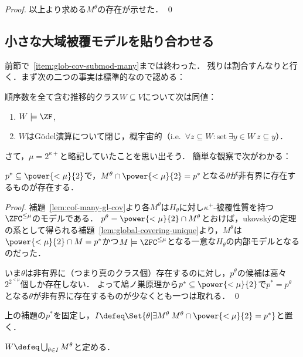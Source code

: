 \documentclass[a4j,leqno]{ltjsarticle}
\begin{document}
\begin{proof}
 以上より求める$M^\theta$の存在が示せた． \qed
\end{proof}

\subsection{小さな大域被覆モデルを貼り合わせる}
前節で~\ref{item:glob-cov-submod-many}までは終わった．
残りは割合すんなりと行く．まず次の二つの事実は標準的なので認める：
\begin{fact}\label{lem:ZF-model-char}
 順序数を全て含む推移的クラス$W \subseteq V$について次は同値：
 \begin{enumerate}
  \item $W \models \ZF$,
  \item $W$はG\"{o}del演算について閉じ，概宇宙的（i.e.\ $\forall z \subseteq W: \text{set}\: \exists y \in W\: z \subseteq y$）．
        \label{}
 \end{enumerate}
\end{fact}

さて，$\mu = 2^{\kappa+}$と略記していたことを思い出そう．
簡単な観察で次がわかる：
\begin{lemma}
 $p^* \subseteq \power{<\mu}{2}$で，$M^\theta \cap \power{<\mu}{2} = p^*$となる$\theta$が非有界に存在するものが存在する．
\end{lemma}
\begin{proof}
 補題~\ref{lem:cof-many-gl-cov}より各$M^\theta$は$H_\theta$に対し$\kappa^+$-被覆性質を持つ$\ZFC^{\leq\mu}$のモデルである．
 $p^\theta = \power{<\mu}{2} \cap M^\theta$とおけば，ukovsk\'{y}の定理の系として得られる補題~\ref{lem:global-covering-unique}より，$M^\theta$は$\power{<\mu}{2} \cap M = p^*$かつ$M \models \ZFC^{\leq\mu}$となる一意な$H_\theta$の内部モデルとなるのだった．

 いま$\theta$は非有界に（つまり真のクラス個）存在するのに対し，$p^\theta$の候補は高々$2^{2^{<\mu}}$個しか存在しない．
 よって鳩ノ巣原理から$p^* \subseteq \power{<\mu}{2}$で$p^* = p^\theta$となる$\theta$が非有界に存在するものが少なくとも一つは取れる． \qed
\end{proof}

\begin{notation}
 上の補題の$p^*$を固定し，$I \defeq \Set{ \theta | \exists M^\theta \: M^\theta \cap \power{<\mu}{2} = p^* }$と置く．

 $W \defeq \bigcup_{\theta \in I} M^\theta$と定める．
\end{notation}
\end{document}
